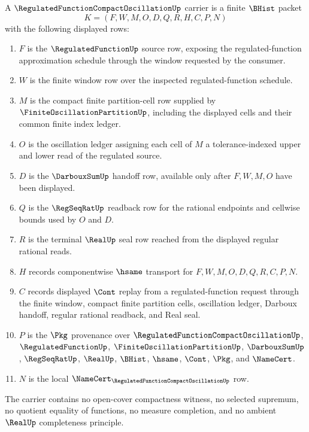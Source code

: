 \begin{definition}
\label{def:regulated-function-compact-oscillation-carrier}
A $\RegulatedFunctionCompactOscillationUp$ carrier is a finite $\BHist$ packet
$$
K=(F,W,M,O,D,Q,R,H,C,P,N)
$$
with the following displayed rows:
\begin{enumerate}
\item $F$ is the $\RegulatedFunctionUp$ source row, exposing the regulated-function approximation schedule through the window requested by the consumer.
\item $W$ is the finite window row over the inspected regulated-function schedule.
\item $M$ is the compact finite partition-cell row supplied by $\FiniteOscillationPartitionUp$, including the displayed cells and their common finite index ledger.
\item $O$ is the oscillation ledger assigning each cell of $M$ a tolerance-indexed upper and lower read of the regulated source.
\item $D$ is the $\DarbouxSumUp$ handoff row, available only after $F,W,M,O$ have been displayed.
\item $Q$ is the $\RegSeqRatUp$ readback row for the rational endpoints and cellwise bounds used by $O$ and $D$.
\item $R$ is the terminal $\RealUp$ seal row reached from the displayed regular rational reads.
\item $H$ records componentwise $\hsame$ transport for $F,W,M,O,D,Q,R,C,P,N$.
\item $C$ records displayed $\Cont$ replay from a regulated-function request through the finite window, compact finite partition cells, oscillation ledger, Darboux handoff, regular rational readback, and Real seal.
\item $P$ is the $\Pkg$ provenance over $\RegulatedFunctionCompactOscillationUp$, $\RegulatedFunctionUp$, $\FiniteOscillationPartitionUp$, $\DarbouxSumUp$, $\RegSeqRatUp$, $\RealUp$, $\BHist$, $\hsame$, $\Cont$, $\Pkg$, and $\NameCert$.
\item $N$ is the local $\NameCert_{\RegulatedFunctionCompactOscillationUp}$ row.
\end{enumerate}
The carrier contains no open-cover compactness witness, no selected supremum, no quotient equality of functions, no measure completion, and no ambient $\RealUp$ completeness principle.
\end{definition}

